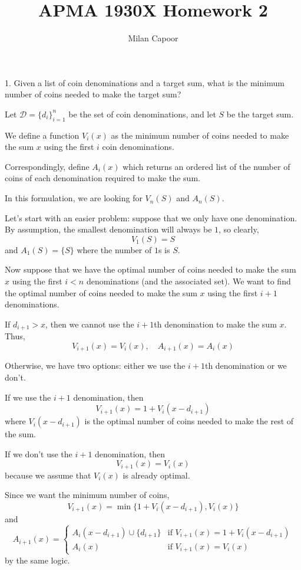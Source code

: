 \documentclass[12pt]{article}
\title{APMA 1930X Homework 2}
\author{Milan Capoor}
\date{}
\begin{document}
\maketitle

1. Given a list of coin denominations and a target sum, what is the minimum number of coins needed to make the target sum? 

    \color{blue}
        Let $\mathcal D = \{d_i\}_{i=1}^{n}$ be the set of coin denominations, and let $S$ be the target sum.

        We define a function $V_i(x)$ as the minimum number of coins needed to make the sum $x$ using the first $i$ coin denominations. 

        Correspondingly, define $A_i(x)$ which returns an ordered list of the number of coins of each denomination required to make the sum. 

        In this formulation, we are looking for $V_n(S)$ and $A_n(S)$. 

        Let's start with an easier problem: suppose that we only have one denomination. By assumption, the smallest denomination will always be $1$, so clearly, 
        \[V_1(S) = S\]
        and $A_1(S) = \{S\}$ where the number of $1$s is $S$.

        Now suppose that we have the optimal number of coins needed to make the sum $x$ using the first $i < n$ denominations (and the associated set). We want to find the optimal number of coins needed to make the sum $x$ using the first $i+1$ denominations.

        If $d_{i+1} > x$, then we cannot use the $i+1$th denomination to make the sum $x$. Thus, 
        \[V_{i+1}(x) = V_i(x), \quad A_{i+1}(x) = A_i(x)\]

        Otherwise, we have two options: either we use the $i+1$th denomination or we don't. 

        If we use the $i+1$ denomination, then 
        \[V_{i+1}(x) = 1 + V_i(x - d_{i+1})\]
        where $V_i(x - d_{i+1})$ is the optimal number of coins needed to make the rest of the sum. 

        If we don't use the $i+1$ denomination, then 
        \[V_{i+1}(x) = V_i(x)\]
        because we assume that $V_i(x)$ is already optimal. 

        Since we want the minimum number of coins, 
        \[V_{i+1}(x) = \min\{1 + V_i(x - d_{i+1}), V_i(x)\}\]
        and 
        \[A_{i+1}(x) = \begin{cases}
            A_i(x - d_{i+1}) \cup \{d_{i+1}\} & \text{if } V_{i+1}(x) = 1 + V_i(x - d_{i+1}) \\
            A_i(x) & \text{if } V_{i+1}(x) = V_i(x)
        \end{cases}\]
        by the same logic.
\end{document}

